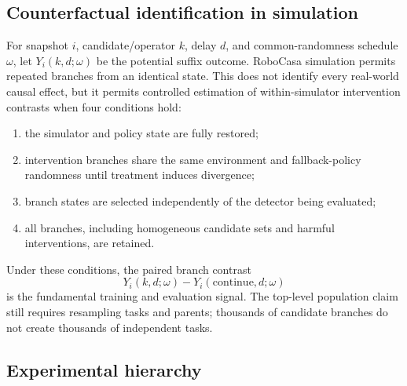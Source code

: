 \subsection{Counterfactual identification in simulation}

For snapshot $i$, candidate/operator $k$, delay $d$, and common-randomness schedule $\omega$, let $Y_i(k,d;\omega)$ be the potential suffix outcome. RoboCasa simulation permits repeated branches from an identical state. This does not identify every real-world causal effect, but it permits controlled estimation of within-simulator intervention contrasts when four conditions hold:
\begin{enumerate}
  \item the simulator and policy state are fully restored;
  \item intervention branches share the same environment and fallback-policy randomness until treatment induces divergence;
  \item branch states are selected independently of the detector being evaluated;
  \item all branches, including homogeneous candidate sets and harmful interventions, are retained.
\end{enumerate}
Under these conditions, the paired branch contrast
\begin{equation}
  Y_i(k,d;\omega)-Y_i(\mathrm{continue},d;\omega)
\end{equation}
is the fundamental training and evaluation signal. The top-level population claim still requires resampling tasks and parents; thousands of candidate branches do not create thousands of independent tasks.

\subsection{Experimental hierarchy}

